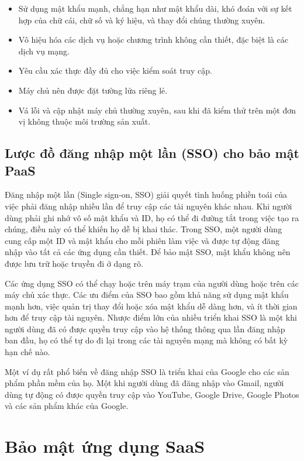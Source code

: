 \begin{itemize}
  \item Sử dụng mật khẩu mạnh, chẳng hạn như mật khẩu dài, khó đoán với sự kết hợp của chữ cái, chữ số và ký hiệu, và thay đổi chúng thường xuyên.
  \item Vô hiệu hóa các dịch vụ hoặc chương trình không cần thiết, đặc biệt là các dịch vụ mạng.
  \item Yêu cầu xác thực đầy đủ cho việc kiểm soát truy cập.
  \item Máy chủ nên được đặt tường lửa riêng lẻ.
  \item Vá lỗi và cập nhật máy chủ thường xuyên, sau khi đã kiểm thử trên một đơn vị không thuộc môi trường sản xuất.
\end{itemize}

\subsection*{Lược đồ đăng nhập một lần (SSO) cho bảo mật PaaS}

Đăng nhập một lần (Single sign-on, SSO) giải quyết tình huống phiền toái của việc phải đăng nhập nhiều lần để truy cập các tài nguyên khác nhau. Khi người dùng phải ghi nhớ vô số mật khẩu và ID, họ có thể đi đường tắt trong việc tạo ra chúng, điều này có thể khiến họ dễ bị khai thác. Trong SSO, một người dùng cung cấp một ID và mật khẩu cho mỗi phiên làm việc và được tự động đăng nhập vào tất cả các ứng dụng cần thiết. Để bảo mật SSO, mật khẩu không nên được lưu trữ hoặc truyền đi ở dạng rõ.

Các ứng dụng SSO có thể chạy hoặc trên máy trạm của người dùng hoặc trên các máy chủ xác thực. Các ưu điểm của SSO bao gồm khả năng sử dụng mật khẩu mạnh hơn, việc quản trị thay đổi hoặc xóa mật khẩu dễ dàng hơn, và ít thời gian hơn để truy cập tài nguyên. Nhược điểm lớn của nhiều triển khai SSO là một khi người dùng đã có được quyền truy cập vào hệ thống thông qua lần đăng nhập ban đầu, họ có thể tự do đi lại trong các tài nguyên mạng mà không có bất kỳ hạn chế nào.

Một ví dụ rất phổ biến về đăng nhập SSO là triển khai của Google cho các sản phẩm phần mềm của họ. Một khi người dùng đã đăng nhập vào Gmail, người dùng tự động có được quyền truy cập vào YouTube, Google Drive, Google Photos và các sản phẩm khác của Google.

\section{Bảo mật ứng dụng SaaS}

